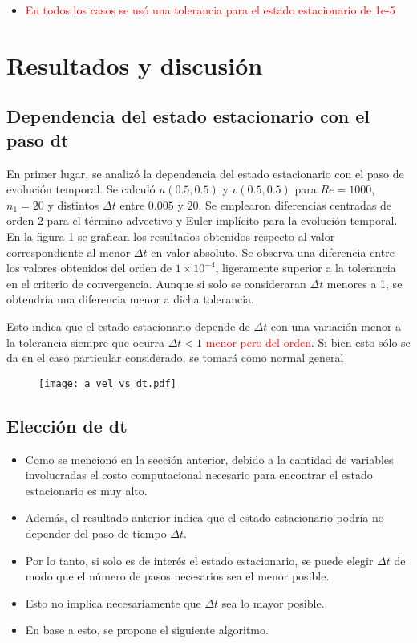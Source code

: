 \documentclass[aps,prb,twocolumn,superscriptaddress,floatfix,longbibliography,10pt]{revtex4-2}
\newcounter{para}
\begin{document}
\begin{itemize}
  \item \textcolor{red}{En todos los casos se usó una tolerancia para el estado estacionario de 1e-5}
\end{itemize}

\section{Resultados y discusión}


\subsection{Dependencia del estado estacionario con el paso dt}

En primer lugar, se analizó la dependencia del estado estacionario con el paso de evolución temporal. Se calculó $u(0.5,0.5)$ y $v(0.5,0.5)$ para $Re = 1000$, $n_1 = 20$ y distintos $\Delta t$ entre $0.005$ y $20$. Se emplearon diferencias centradas de orden 2 para el término advectivo y Euler implícito para la evolución temporal. En la figura \ref{fig:a_vel_vs_dt} se grafican los resultados obtenidos respecto al valor correspondiente al menor $\Delta t$ en valor absoluto. Se observa una diferencia entre los valores obtenidos del orden de $1 \times 10^{-4}$, ligeramente superior a la tolerancia en el criterio de convergencia. Aunque si solo se consideraran $\Delta t$ menores a 1, se obtendría una diferencia menor a dicha tolerancia.

Esto indica que el estado estacionario depende de $\Delta t$ con una variación menor a la tolerancia siempre que ocurra $\Delta t < 1$ \textcolor{red}{menor pero del orden}. Si bien esto sólo se da en el caso particular considerado, se tomará como normal general



\begin{figure}[h]
  \texttt{[image: a\_vel\_vs\_dt.pdf]}
  \caption{}
   \label{fig:a_vel_vs_dt}
\end{figure}



\subsection{Elección de dt}

\begin{itemize}
  \item Como se mencionó en la sección anterior, debido a la cantidad de variables involucradas el costo computacional necesario para encontrar el estado estacionario es muy alto.
  \item Además, el resultado anterior indica que el estado estacionario podría no depender del paso de tiempo $\Delta t$.
  \item Por lo tanto, si solo es de interés el estado estacionario, se puede elegir $\Delta t$ de modo que el número de pasos necesarios sea el menor posible.
  \item Esto no implica necesariamente que $\Delta t$ sea lo mayor posible.
  \item En base a esto, se propone el siguiente algoritmo.
\end{itemize}
\end{document}
